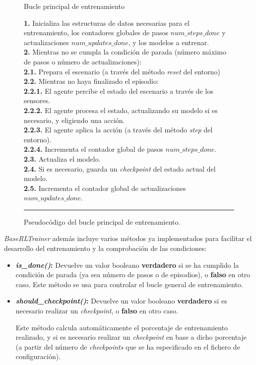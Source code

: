 \begin{itemize}
	\begin{figure}[h]
\begin{algorithm}[H]
\caption{Bucle principal de entrenamiento}
\textbf{1.} Inicializa las estructuras de datos necesarias para el entrenamiento, los contadores globales de pasos $num\_steps\_done$ y actualizaciones $num\_updates\_done$, y los modelos a entrenar.\\
\textbf{2.} Mientras no se cumpla la condición de parada (número máximo de pasos o número de actualizaciones):\\
\Indp \textbf{2.1.} Prepara el escenario (a través del método \textit{reset} del entorno)\\
\textbf{2.2.} Mientras no haya finalizado el episodio:\\
\Indp \textbf{2.2.1.} El agente percibe el estado del escenario a través de los sensores.\\
\textbf{2.2.2.} El agente procesa el estado, actualizando su modelo si es necesario, y eligiendo una acción.\\
\textbf{2.2.3.} El agente aplica la acción (a través del método \textit{step} del entorno).\\
\textbf{2.2.4.} Incrementa el contador global de pasos $num\_steps\_done$.\\
\Indm \textbf{2.3.} Actualiza el modelo.\\
\textbf{2.4.} Si es necesario, guarda un \textit{checkpoint} del estado actual del modelo.\\
\textbf{2.5.} Incrementa el contador global de actualizaciones $num\_updates\_done$.
\end{algorithm}
\hrule
\caption{Pseudocódigo del bucle principal de entrenamiento.}
\label{alg:train}
\end{figure}
\end{itemize}


\textit{BaseRLTrainer} además incluye varios métodos ya implementados para facilitar el desarrollo del entrenamiento y la comprobación de las condiciones:

\begin{itemize}
	\item \textbf{\textit{is{\_}done()}:} Devuelve un valor booleano \textbf{verdadero} si se ha cumplido la condición de parada (ya sea número de pasos o de episodios), o \textbf{falso} en otro caso. Este método se usa para controlar el bucle general de entrenamiento.
	\item \textbf{\textit{should{\_}checkpoint()}:} Devuelve un valor booleano \textbf{verdadero} si es necesario realizar un \textit{checkpoint}, o \textbf{falso} en otro caso.
	
	Este método calcula automáticamente el porcentaje de entrenamiento realizado, y si es necesario realizar un \textit{checkpoint} en base a dicho porcentaje (a partir del número de \textit{checkpoints} que se ha especificado en el fichero de configuración).
\end{itemize}

